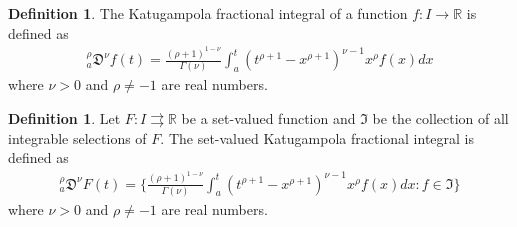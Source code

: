 \documentclass{amsproc}
\theoremstyle{definition}
\newtheorem{definition}[theorem]{Definition}
\theoremstyle{remark}
\numberwithin{equation}{section}
\begin{document}
    \begin{definition}
        The Katugampola fractional integral of a function  $f:I \to \mathbb{R}$ is defined as 
        \begin{equation*}
            \begin{aligned}
        _a^\rho\mathfrak{D}^\nu f(t)= \frac{(\rho+1)^{1-\nu}}{\Gamma(\nu)}\int_a^t(t^{\rho+1}-x^{\rho+1})^{\nu-1}x^{\rho}f(x)dx
    \end{aligned}
        \end{equation*}
        where $\nu>0$ and $\rho \neq -1$ are real numbers. 
    \end{definition}
\begin{definition} \label{K1}
Let $F:I\rightrightarrows \mathbb{R}$ be a set-valued function and $\mathfrak{I}$ be the collection of all integrable selections of $F.$ The set-valued Katugampola fractional integral is defined as 
\begin{equation*}
    \begin{aligned}
        _a^\rho\mathfrak{D}^\nu F(t)=\bigg\{\frac{(\rho+1)^{1-\nu}}{\Gamma(\nu)}\int_a^t(t^{\rho+1}-x^{\rho+1})^{\nu-1}x^{\rho}f(x)dx:f\in\mathfrak{I}\bigg\}
    \end{aligned}
\end{equation*}
where $\nu>0$ and $\rho \neq -1$ are real numbers.
\end{definition}
    
\end{document}

